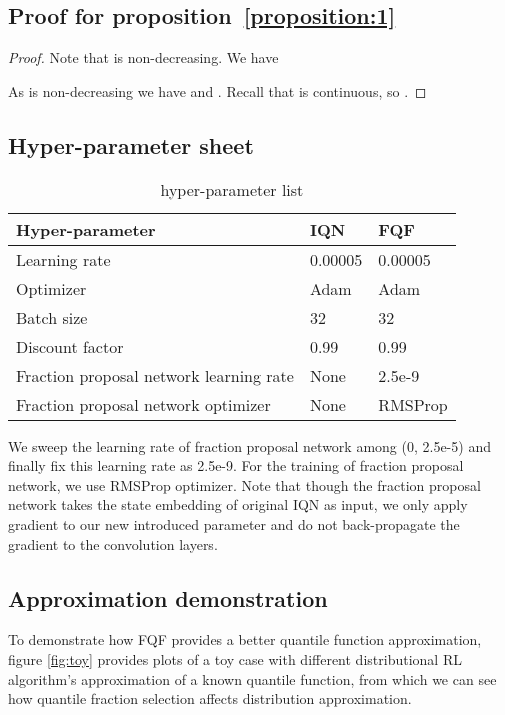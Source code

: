 \documentclass{article}
\begin{document}
\subsection*{Proof for proposition~\ref{proposition:1}}
\prop*
 
\begin{proof}
Note that  is non-decreasing. We have



As  is non-decreasing we have  and . Recall that  is continuous, so .
\end{proof}

\newpage

\subsection*{Hyper-parameter sheet}
\begin{table*}[ht]
	\centering
    \begin{tabular}{l|l|l}
Hyper-parameter & IQN & FQF \\ \hline
Learning rate & 0.00005 & 0.00005 \\
Optimizer & Adam & Adam \\
Batch size & 32 & 32 \\
Discount factor & 0.99 & 0.99 \\
Fraction proposal network learning rate & None & 2.5e-9 \\
Fraction proposal network optimizer & None & RMSProp \\
	\end{tabular}
\caption{hyper-parameter list}  \label{hyperparameter}
\end{table*}
We sweep the learning rate of fraction proposal network among (0, 2.5e-5) and finally fix this learning rate as 2.5e-9. For the training of fraction proposal network, we use RMSProp optimizer. Note that though the fraction proposal network takes the state embedding of original IQN as input, we only apply gradient to our new introduced parameter and do not back-propagate the gradient to the convolution layers.

\subsection*{Approximation demonstration}
To demonstrate how FQF provides a better quantile function approximation, figure \ref{fig:toy} provides plots of a toy case with different distributional RL algorithm's approximation of a known quantile function, from which we can see how quantile fraction selection affects distribution approximation.
\end{document}
